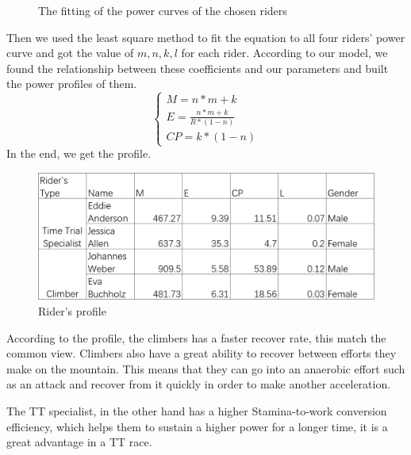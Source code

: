 \documentclass[12pt]{article}
\begin{document}
\begin{figure}[H]
    \centering

    \caption{The fitting of the power curves of the chosen riders}
\end{figure}
Then we used the least square method to fit the equation to all four riders' power curve and  %
got the value of $m,n,k,l$ for each rider. According to our model, we found the relationship between these
coefficients and our parameters and built the power profiles of them.
\begin{equation}
    \left\{
    \begin{array}{c}
        M=n*m+k                 \\
        E=\frac{n*m+k}{R*(1-n)} \\
        CP=k*(1-n)
    \end{array}
    \right.
\end{equation}
In the end, we get the profile.
\begin{figure}
    \centering
    \includegraphics[width=.8\columnwidth]{Rider's profile.jpg}
    \caption{Rider's profile}
\end{figure}
According to the profile, the climbers has a faster recover rate, this match the common view. Climbers also have a great ability to recover between efforts they make on
the mountain. This means that they can go into an anaerobic effort such as an attack and recover from it quickly in order to make another acceleration.

The TT specialist, in the other hand has a higher Stamina-to-work conversion efficiency, which helps them to sustain a higher power for a longer time, it is a great advantage
in a TT race.
\end{document}
